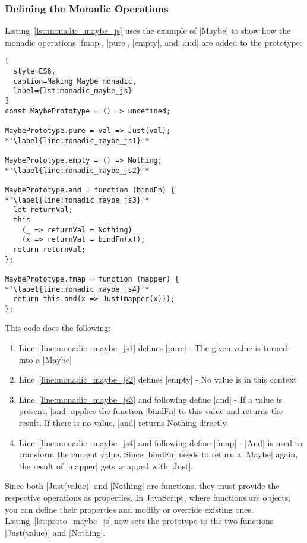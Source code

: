 \subsubsection{Defining the Monadic Operations} %
\label{sec:Defining the Monadic Operations}
Listing~\ref{lst:monadic_maybe_js} uses the example of |Maybe| to show how the
monadic operations |fmap|, |pure|, |empty|, and |and| are added to the
prototype:
\begin{lstlisting}[
  style=ES6,
  caption=Making Maybe monadic,
  label={lst:monadic_maybe_js}
]
const MaybePrototype = () => undefined;

MaybePrototype.pure = val => Just(val); *'\label{line:monadic_maybe_js1}'*

MaybePrototype.empty = () => Nothing; *'\label{line:monadic_maybe_js2}'*

MaybePrototype.and = function (bindFn) { *'\label{line:monadic_maybe_js3}'*
  let returnVal;
  this
    (_ => returnVal = Nothing)
    (x => returnVal = bindFn(x));
  return returnVal;
};

MaybePrototype.fmap = function (mapper) { *'\label{line:monadic_maybe_js4}'*
  return this.and(x => Just(mapper(x)));
};
\end{lstlisting}
This code does the following:
\begin{enumerate}
  \item Line~\ref{line:monadic_maybe_js1} defines |pure| - The given value is turned
    into a |Maybe|
  \item Line~\ref{line:monadic_maybe_js2} defines |empty| - No value is in this
    context
  \item Line~\ref{line:monadic_maybe_js3} and following define |and| - If a
    value is present, |and| applies the function |bindFn| to this value and
    returns the result. If there is no value, |and| returns Nothing directly.
  \item Line~\ref{line:monadic_maybe_js4} and following define |fmap| - |And|
    is used to transform the current value. Since |bindFn| needs to return a
    |Maybe| again, the result of |mapper| gets wrapped with |Just|.
\end{enumerate}

Since both |Just(value)| and |Nothing| are functions, they must provide the respective
operations as properties. In JavaScript, where functions are objects, you can
define their properties and modify or override existing ones. \\
Listing~\ref{lst:proto_maybe_js} now sets the prototype to the two functions
|Just(value)| and |Nothing|.

